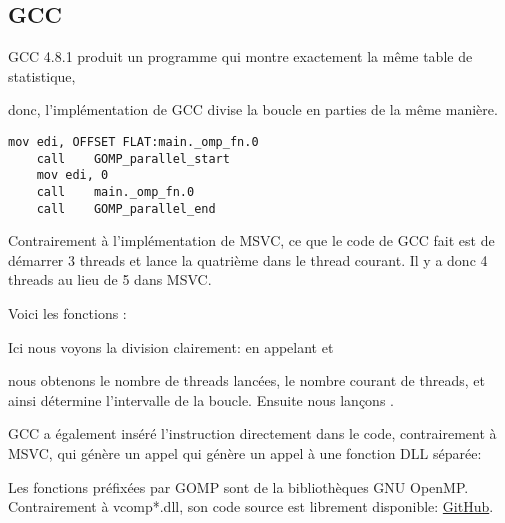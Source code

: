\subsection{GCC}

GCC 4.8.1 produit un programme qui montre exactement la même table de statistique,

donc, l'implémentation de GCC divise la boucle en parties de la même manière.

\begin{lstlisting}[caption=GCC 4.8.1,style=customasmx86]
	mov	edi, OFFSET FLAT:main._omp_fn.0
	call	GOMP_parallel_start
	mov	edi, 0
	call	main._omp_fn.0
	call	GOMP_parallel_end
\end{lstlisting}

Contrairement à l'implémentation de MSVC, ce que le code de GCC fait est de démarrer
3 threads et lance la quatrième dans le thread courant. Il y a donc 4 threads au
lieu de 5 dans MSVC.

Voici les fonctions : 



Ici nous voyons la division clairement: en appelant
 et 

nous obtenons le nombre de threads lancées, le nombre courant de threads,
et ainsi détermine l'intervalle de la boucle.
Ensuite nous lançons .

GCC a également inséré l'instruction  directement dans le code, contrairement
à MSVC, qui génère un appel qui génère un appel à une fonction DLL séparée:



Les fonctions préfixées par GOMP sont de la bibliothèques GNU OpenMP.
Contrairement à vcomp*.dll, son code source est librement disponible:
\href{http://go.yurichev.com/17102}{GitHub}.
